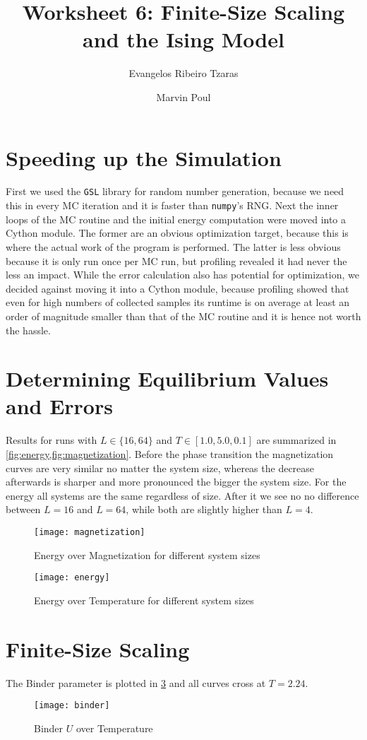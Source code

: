 \documentclass[a4paper,11pt,bibtotoc]{scrartcl}
\title{Worksheet 6: Finite-Size Scaling and the Ising Model}
\author{Evangelos Ribeiro Tzaras \and Marvin Poul}
\begin{document}
\maketitle

\section{Speeding up the Simulation}

First we used the \texttt{GSL} library for random number generation, because we need
this in every MC iteration and it is faster than \texttt{numpy}'s RNG. Next
the inner loops of the MC routine and the initial energy computation were moved
into a Cython module. The former are an obvious optimization target, because
this is where the actual work of the program is performed. The latter is less
obvious because it is only run once per MC run, but profiling revealed it had
never the less an impact. While the error calculation also has potential for
optimization, we decided against moving it into a Cython module, because
profiling showed that even for high numbers of collected samples its runtime is
on average at least an order of magnitude smaller than that of the MC routine
and it is hence not worth the hassle.

\section{Determining Equilibrium Values and Errors}

Results for runs with $L \in \{16, 64\}$ and $T \in [1.0, 5.0, 0.1]$ are
summarized in \cref{fig:energy,fig:magnetization}. Before the phase transition
the magnetization curves are very similar no matter the system size, whereas
the decrease afterwards is sharper and more pronounced the bigger the system
size. For the energy all systems are the same regardless of size.
After it we see no no difference between $L = 16$ and $L = 64$, while both
are slightly higher than $L = 4$. 

\begin{figure}[htb]
    \centering
    \texttt{[image: magnetization]}
    \caption{Energy over Magnetization for different system sizes}
    \label{fig:magnetization}
\end{figure}

\begin{figure}[htb]
    \centering
    \texttt{[image: energy]}
    \caption{Energy over Temperature for different system sizes}
    \label{fig:energy}
\end{figure}

\section{Finite-Size Scaling}

The Binder parameter is plotted in \cref{fig:binder} and all curves cross at $T
= 2.24$.

\begin{figure}[htb]
    \centering
    \texttt{[image: binder]}
    \caption{Binder $U$ over Temperature}
    \label{fig:binder}
\end{figure}
\end{document}
